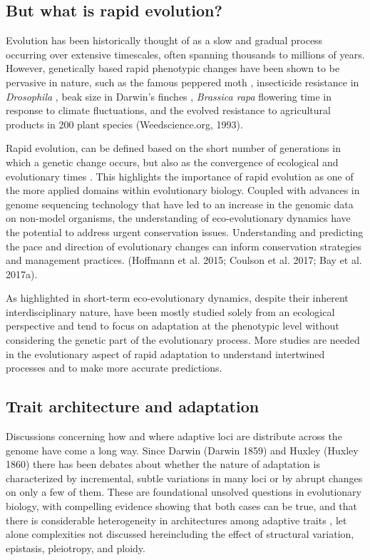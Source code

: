 \documentclass{article}
\begin{document}
\subsection{But what is rapid evolution?}
Evolution has been historically thought of as a slow and gradual process occurring over extensive timescales, often spanning thousands to millions of years. However, genetically based rapid phenotypic changes have been shown to be pervasive in nature, such as the famous peppered moth \citep{Cook2013-bs}, insecticide resistance in \textit{Drosophila} \citep{Daborn2002-is},  beak size in Darwin’s finches \citep{Grant2008-uc}, \textit{Brassica  rapa} flowering time in response to climate fluctuations, and the evolved resistance to agricultural products in 200 plant species (Weedscience.org, 1993). 

Rapid evolution, can be defined based on the short number of generations in which a genetic change occurs, but also as the convergence of ecological and evolutionary times \citep{Hairston2005-qo}. This highlights the importance of rapid evolution as one of the more applied domains within evolutionary biology. Coupled with advances in genome sequencing technology that have led to an increase in the genomic data on non-model organisms, the understanding of eco-evolutionary dynamics have the potential to address urgent conservation issues. Understanding and predicting the pace and direction of evolutionary changes can inform conservation strategies and management practices. (Hoffmann  et al. 2015; Coulson et al. 2017; Bay et al. 2017a).

As highlighted in \citep{Yamamichi2022-yj} short-term eco-evolutionary dynamics, despite their inherent interdisciplinary nature, have been mostly studied solely from an ecological perspective and tend to focus on adaptation at the phenotypic level without considering the genetic part of the evolutionary process. More studies are needed in the evolutionary aspect of rapid adaptation to understand intertwined processes and to make more accurate predictions. \citep{Rudman2022-uc}

\subsection{Trait architecture and adaptation}

Discussions concerning  how and where adaptive loci are distribute across the genome have come a long way. Since Darwin (Darwin 1859) and Huxley (Huxley 1860) there has been debates about whether the nature of adaptation is characterized by incremental, subtle variations in many loci or by abrupt changes on only a few of them. These are foundational unsolved questions in evolutionary biology, with compelling evidence showing that both cases can be true, and that there is considerable heterogeneity in architectures among adaptive traits \citep{Orr1992-xj, Orr1998-pr}, let alone complexities not discussed hereincluding  the effect of structural variation, epistasis, pleiotropy, and ploidy. 
\end{document}
